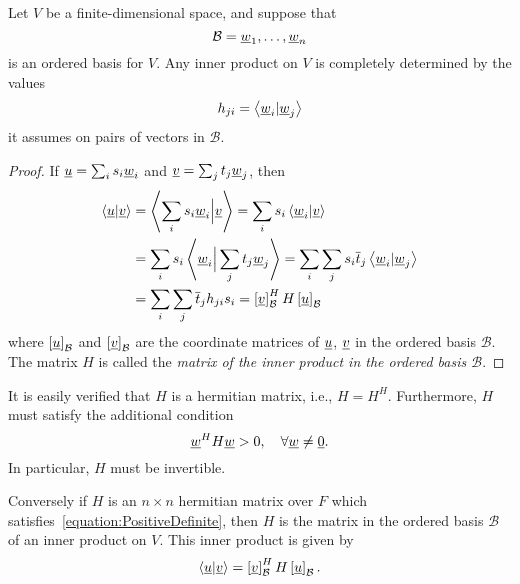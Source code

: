 \begin{theorem}
Let $V$ be a finite-dimensional space, and suppose that
\begin{equation*}
\mathcal{B} = \underline{w}_1, \ldots, \underline{w}_n
\end{equation*}
is an ordered basis for $V$.
Any inner product on $V$ is completely determined by the values
\begin{equation*}
h_{ji} = \left\langle \underline{w}_i | \underline{w}_j \right\rangle
\end{equation*}
it assumes on pairs of vectors in $\mathcal{B}$.
\end{theorem}
\begin{proof}
If $\underline{u} = \sum_{i} s_i \underline{w}_i$ and $\underline{v} = \sum_{j} t_j \underline{w}_j$, then
\begin{equation*}
\begin{split}
\left\langle \underline{u} | \underline{v} \right\rangle
&= \left\langle \sum_{i} s_i \underline{w}_i \Big| \underline{v} \right\rangle
= \sum_{i} s_i \left\langle \underline{w}_i | \underline{v} \right\rangle \\
&= \sum_{i} s_i \left\langle \underline{w}_i \Big| \sum_{j} t_j \underline{w}_j \right\rangle
= \sum_{i} \sum_{j} s_i \overline{t}_j \left\langle \underline{w}_i | \underline{w}_j \right\rangle \\
&= \sum_{i} \sum_{j} \overline{t}_j h_{ji} s_i
= \left[ \underline{v} \right]_{\mathcal{B}}^H H \left[ \underline{u} \right]_{\mathcal{B}}
\end{split}
\end{equation*}
where $\left[ \underline{u} \right]_{\mathcal{B}}$ and $\left[ \underline{v} \right]_{\mathcal{B}}$ are the coordinate matrices of $\underline{u}$, $\underline{v}$ in the ordered basis $\mathcal{B}$.
The matrix $H$ is called the \emph{matrix of the inner product in the ordered basis $\mathcal{B}$}.
\end{proof}

It is easily verified that $H$ is a hermitian matrix, i.e., $H = H^H$.
Furthermore, $H$ must satisfy the additional condition
\begin{equation} \label{equation:PositiveDefinite}
\underline{w}^H H \underline{w} > 0, \quad \forall \underline{w} \neq \underline{0}.
\end{equation}
In particular, $H$ must be invertible.

Conversely if $H$ is an $n \times n$ hermitian matrix over $F$ which satisfies~\eqref{equation:PositiveDefinite}, then $H$ is the matrix in the ordered basis $\mathcal{B}$ of an inner product on $V$.
This inner product is given by
\begin{equation*}
\left\langle \underline{u} | \underline{v} \right\rangle
= \left[ \underline{v} \right]_{\mathcal{B}}^H H \left[ \underline{u} \right]_{\mathcal{B}}.
\end{equation*}

